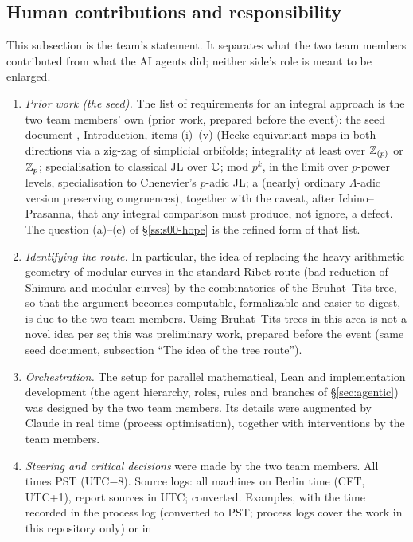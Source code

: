 \subsection{Human contributions and responsibility}\label{ss:human}
This subsection is the team's statement. It separates what the two team members contributed from what the AI agents did;
neither side's role is meant to be enlarged.
\begin{enumerate}[label=(\arabic*)]
\item \emph{Prior work (the seed).} The list of requirements for an integral approach is the two team members' own (prior
  work, prepared before the event): the seed document , Introduction, items
  (i)--(v) (Hecke-equivariant maps in both directions via a zig-zag of simplicial orbifolds; integrality at least over
  $\mathbb{Z}_{(p)}$ or $\mathbb{Z}_p$; specialisation to classical JL over $\mathbb{C}$; mod $p^k$, in the limit over $p$-power levels, specialisation to
  Chenevier's $p$-adic JL; a (nearly) ordinary $\Lambda$-adic version preserving congruences), together with the caveat, after
  Ichino--Prasanna, that any integral comparison must produce, not ignore, a defect. The question (a)--(e) of
  \S\ref{ss:s00-hope} is the refined form of that list.
\item \emph{Identifying the route.} In particular, the idea of replacing the heavy arithmetic geometry of modular curves in
  the standard Ribet route (bad reduction of Shimura and modular curves) by the combinatorics of the Bruhat--Tits tree, so that
  the argument becomes computable, formalizable and easier to digest, is due to the two team members. Using Bruhat--Tits trees in
  this area is not a novel idea per se; this was preliminary work, prepared before the event (same seed document, subsection
  ``The idea of the tree route'').
\item \emph{Orchestration.} The setup for parallel mathematical, Lean and implementation development (the agent hierarchy,
  roles, rules and branches of \S\ref{sec:agentic}) was designed by the two team members. Its details were augmented by Claude
  in real time (process optimisation), together with interventions by the team members.
\item \emph{Steering and critical decisions} were made by the two team members. All times PST (UTC$-$8). Source logs: all machines on Berlin time (CET, UTC+1), report sources in UTC; converted. Examples, with the time recorded in
  the process log  (converted to PST; process logs cover the work in this repository only) or in 

\end{enumerate}
